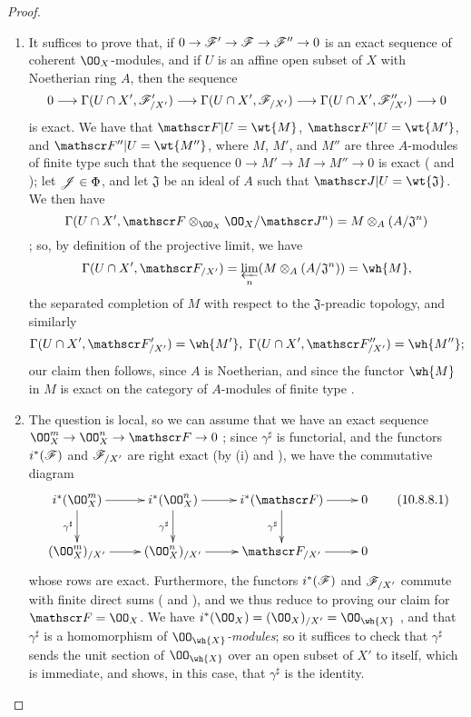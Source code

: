 \begin{proof}
\label{proof-1.10.8.8}
\medskip\noindent
\begin{enumerate}[label=(\roman*)]
  \item It suffices to prove that, if $0\to\sh{F}'\to\sh{F}\to\sh{F}''\to 0$ is an exact sequence of coherent $\OO_X$-modules, and if $U$ is an affine open subset of $X$ with Noetherian ring $A$, then the sequence
\[
  0\to\Gamma(U\cap X',\sh{F}_{/X'}')\to\Gamma(U\cap X',\sh{F}_{/X'})\to\Gamma(U\cap X',\sh{F}_{/X'}'')\to 0
\]
is exact.
We have that $\sh{F}|U=\wt{M}$, $\sh{F}'|U=\wt{M'}$, and $\sh{F}''|U=\wt{M''}$, where $M$, $M'$, and $M''$ are three $A$-modules of finite type such that the sequence $0\to M'\to M\to M''\to 0$ is exact ( and ); let $\mathscr{J}\in\Phi$, and let $\mathfrak{J}$ be an ideal of $A$ such that $\sh{J}|U=\wt{\mathfrak{J}}$.
We then have
\[
  \Gamma(U\cap X',\sh{F}\otimes_{\OO_X}\OO_X/\sh{J}^n)=M\otimes_A(A/\mathfrak{J}^n)
\]
; so, by definition of the projective limit, we have
\[
  \Gamma(U\cap X',\sh{F}_{/X'})=\varprojlim_n(M\otimes_A(A/\mathfrak{J}^n))=\wh{M},
\]
the separated completion of $M$ with respect to the $\mathfrak{J}$-preadic topology, and similarly
\[
  \Gamma(U\cap X',\sh{F}_{/X'}')=\wh{M'},\ \Gamma(U\cap X',\sh{F}_{/X'}'')=\wh{M''};
\]
our claim then follows, since $A$ is Noetherian, and since the functor $\wh{M}$ in $M$ is exact on the category of $A$-modules of finite type .
  \item The question is local, so we can assume that we have an exact sequence $\OO_X^m\to\OO_X^n\to\sh{F}\to 0$ ; since $\gamma^\sharp$ is functorial, and the functors $i^*(\mathscr{F})$ and $\mathscr{F}_{/X'}$ are right exact (by (i) and ), we have the commutative diagram
\begin{equation*}
\label{1.10.8.8.1}
  \xymatrix{
    i^*(\OO_X^m)\ar[r]\ar[d]_{\gamma^\sharp} &
    i^*(\OO_X^n)\ar[r]\ar[d]_{\gamma^\sharp} &
    i^*(\sh{F})\ar[r]\ar[d]_{\gamma^\sharp} &
    0\\
    (\OO_X^m)_{/X'}\ar[r] &
    (\OO_X^n)_{/X'}\ar[r] &
    \sh{F}_{/X'}\ar[r] &
    0
  }
  \tag{10.8.8.1}
\end{equation*}
whose rows are exact.
Furthermore, the functors $i^*(\mathscr{F})$ and $\mathscr{F}_{/X'}$ commute with finite direct sums ( and ), and we thus reduce to proving our claim for $\sh{F}=\OO_X$.
We have $i^*(\OO_X)=(\OO_X)_{/X'}=\OO_\wh{X}$ , and that $\gamma^\sharp$ is a homomorphism of \emph{$\OO_\wh{X}$-modules}; so it suffices to check that $\gamma^\sharp$ sends the unit section of $\OO_\wh{X}$ over an open subset of $X'$ to itself, which is immediate, and shows, in this case, that $\gamma^\sharp$ is the identity.
\end{enumerate}
\end{proof}

